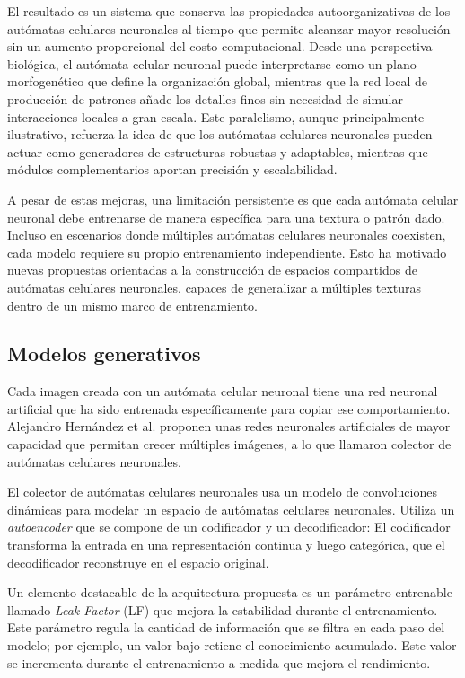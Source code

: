 El resultado es un sistema que conserva las propiedades autoorganizativas de los autómatas celulares neuronales al tiempo que permite alcanzar mayor resolución sin un aumento proporcional del costo computacional. Desde una perspectiva biológica, el autómata celular neuronal puede interpretarse como un plano morfogenético que define la organización global, mientras que la red local de producción de patrones añade los detalles finos sin necesidad de simular interacciones locales a gran escala. Este paralelismo, aunque principalmente ilustrativo, refuerza la idea de que los autómatas celulares neuronales pueden actuar como generadores de estructuras robustas y adaptables, mientras que módulos complementarios aportan precisión y escalabilidad.

A pesar de estas mejoras, una limitación persistente es que cada autómata celular neuronal debe entrenarse de manera específica para una textura o patrón dado. Incluso en escenarios donde múltiples autómatas celulares neuronales coexisten, cada modelo requiere su propio entrenamiento independiente. Esto ha motivado nuevas propuestas orientadas a la construcción de espacios compartidos de autómatas celulares neuronales, capaces de generalizar a múltiples texturas dentro de un mismo marco de entrenamiento.

\subsection{Modelos generativos}

Cada imagen creada con un autómata celular neuronal tiene una red neuronal artificial que ha sido entrenada específicamente para copiar ese comportamiento. Alejandro Hernández et al. \cite{NCAM} proponen unas redes neuronales artificiales de mayor capacidad que permitan crecer múltiples imágenes, a lo que llamaron colector de autómatas celulares neuronales.

El colector de autómatas celulares neuronales usa un modelo de convoluciones dinámicas para modelar un espacio de autómatas celulares neuronales. Utiliza un \textit{autoencoder} que se compone de un codificador y un decodificador: El codificador transforma la entrada en una representación continua y luego categórica, que el decodificador reconstruye en el espacio original.

Un elemento destacable de la arquitectura propuesta es un parámetro entrenable llamado \textit{Leak Factor} (LF) que mejora la estabilidad durante el entrenamiento. Este parámetro regula la cantidad de información que se filtra en cada paso del modelo; por ejemplo, un valor bajo retiene el conocimiento acumulado. Este valor se incrementa durante el entrenamiento a medida que mejora el rendimiento.

